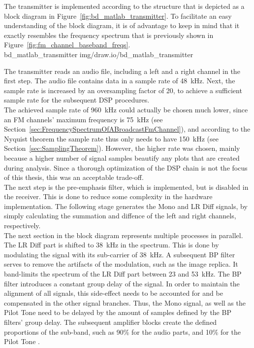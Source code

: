 The transmitter is implemented according to the structure that is depicted as a block diagram in Figure~\ref{fig:bd_matlab_transmitter}.
To facilitate an easy understanding of the block diagram, it is of advantage to keep in mind that it exactly resembles the frequency spectrum that is previously shown in Figure~\ref{fig:fm_channel_baseband_freqs}.\\

 {bd_matlab_transmitter} {img/draw.io/bd_matlab_transmitter}

The transmitter reads an audio file, including a left and a right channel in the first step.
The audio file contains data in a sample rate of 48~kHz.
Next, the sample rate is increased by an oversampling factor of 20, to achieve a sufficient sample rate for the subsequent DSP procedures.\\

The achieved sample rate of 960~kHz could actually be chosen much lower, since an FM channels' maximum frequency is 75~kHz (see Section~\ref{sec:FrequencySpectrumOfABroadcastFmChannel}), and according to the Nyquist theorem the sample rate thus only needs to have 150~kHz (see Section~\ref{sec:SamplingTheorem}).
However, the higher rate was chosen, mainly because a higher number of signal samples beautify any plots that are created during analysis.
Since a thorough optimization of the DSP chain is not the focus of this thesis, this was an acceptable trade-off.\\

The next step is the pre-emphasis filter, which is implemented, but is disabled in the receiver.
This is done to reduce some complexity in the hardware implementation.
The following stage generates the Mono and LR Diff signals, by simply calculating the summation and diffence of the left and right channels, respectively.\\

The next section in the block diagram represents multiple processes in parallel.
The LR Diff part is shifted to 38~kHz in the spectrum.
This is done by modulating the signal with its sub-carrier of 38~kHz.
A subsequent BP filter serves to remove the artifacts of the modulation, such as the image replica.
It band-limits the spectrum of the LR Diff part between 23 and 53~kHz.
The BP filter introduces a constant group delay of the signal.
In order to maintain the alignment of all signals, this side-effect needs to be accounted for and be compensated in the other signal branches.
Thus, the Mono signal, as well as the Pilot Tone need to be delayed by the amount of samples defined by the BP filters' group delay.
The subsequent amplifier blocks create the defined proportions of the sub-band, such as 90\% for the audio parts, and 10\% for the Pilot Tone \cite{FmMultiplexingForStereo}.\\

